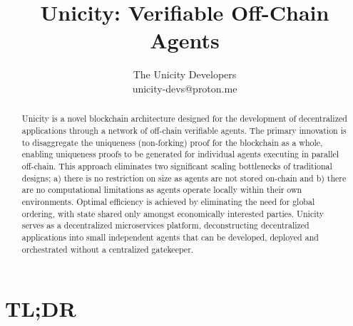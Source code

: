 \documentclass{article}
\title{Unicity: Verifiable Off-Chain Agents}
\author{The Unicity Developers\\unicity-devs@proton.me}
\date{}
\begin{document}
\maketitle



\begin{abstract}
\noindent  Unicity is a novel blockchain architecture designed for the development of decentralized applications through a network of off-chain verifiable agents. The primary innovation is to disaggregate the uniqueness (non-forking) proof for the blockchain as a whole, enabling uniqueness proofs to be generated for individual agents executing in parallel off-chain. This approach eliminates two significant scaling bottlenecks of traditional designs; a) there is no restriction on size as agents are not stored on-chain and b) there are no computational limitations as agents operate locally within their own environments. Optimal efficiency is achieved by eliminating the need for global ordering, with state shared only amongst economically interested parties. Unicity serves as a decentralized microservices platform, deconstructing decentralized applications into small independent agents that can be developed, deployed and orchestrated without a centralized gatekeeper.


\end{abstract}

\vspace{2mm}




\section*{TL;DR}
\end{document}
